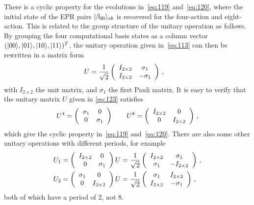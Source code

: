\documentclass[12pt,a4paper]{article}
\begin{document}
There is a cyclic property for the evolutions in~\eqref{eq:119} and~\eqref{eq:120}, where the initial state of the EPR pairs $\arrowvert\beta_{00}\rangle_{ab}$ is recovered for the four-action and eight-action. This is related to the group structure of the unitary operation as follows. By grouping the four computational basis states as a column vector
$(\arrowvert00\rangle,\arrowvert01\rangle,\arrowvert10\rangle,\arrowvert11\rangle)^{T}$, the unitary operation given in~\eqref{eq:113} can then be rewritten
in a matrix form
\begin{equation}
\label{eq:123}
\begin{split}
U &= \frac{1}{\sqrt2}\left(\begin{array}{c c}
I_{2\times 2} & \sigma_1 \\
I_{2\times 2} & -\sigma_1
\end{array}\right) \,,
\end{split}
\end{equation}
with $I_{2\times 2}$ the unit matrix, and $\sigma_1$ the first Pauli
matrix. It is easy to verify that the unitary matrix $U$ given in
\eqref{eq:123} satisfies
\begin{equation}
\label{eq:124}
\begin{split}
U^4 = \left(\begin{array}{c c}
\sigma_1  & 0 \\
0 & \sigma_1
\end{array}\right) \qquad U^8 = \left(\begin{array}{c c}
I_{2\times 2}  & 0 \\
0 & I_{2\times 2}
\end{array}\right)\,,
\end{split}
\end{equation}
which give the cyclic property in~\eqref{eq:119} and~\eqref{eq:120}. There are also some other unitary operations with different periods, for example
\begin{subequations}\label{eq:125}
\begin{align}
\label{eq:125:1} U_1 &= \left(\begin{array}{c c}
I_{2\times 2} & 0 \\
0 & \sigma_1
\end{array}\right)U = \frac{1}{\sqrt2}\left(\begin{array}{c c}
I_{2\times 2} & \sigma_1 \\
\sigma_1 & -I_{2\times 2}
\end{array}\right) \,,
\\
\label{eq:125:2} U_2 &= \left(\begin{array}{c c}
\sigma_1 & 0 \\
0 &I_{2\times 2}
\end{array}\right)U = \frac{1}{\sqrt2}\left(\begin{array}{c c}
\sigma_1 &  I_{2\times 2}\\
I_{2\times 2} & -\sigma_1
\end{array}\right)\,,
\end{align}
\end{subequations}
both of which have a period of 2, not 8.
\end{document}
